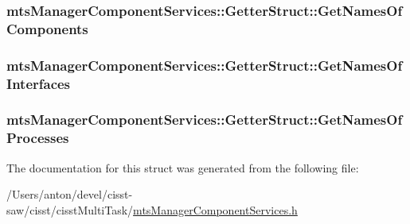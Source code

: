 \subsubsection[{Get\+Names\+Of\+Components}]{ mts\+Manager\+Component\+Services\+::\+Getter\+Struct\+::\+Get\+Names\+Of\+Components}\label{structmts_manager_component_services_1_1_getter_struct_ae997570edfaea8189ee50a91cfaa1359}
\hypertarget{structmts_manager_component_services_1_1_getter_struct_a0783d016f0e0dc078a89769f2b66f334}{}
\subsubsection[{Get\+Names\+Of\+Interfaces}]{ mts\+Manager\+Component\+Services\+::\+Getter\+Struct\+::\+Get\+Names\+Of\+Interfaces}\label{structmts_manager_component_services_1_1_getter_struct_a0783d016f0e0dc078a89769f2b66f334}
\hypertarget{structmts_manager_component_services_1_1_getter_struct_a1873270501352f0f330b0d21f555956c}{}
\subsubsection[{Get\+Names\+Of\+Processes}]{ mts\+Manager\+Component\+Services\+::\+Getter\+Struct\+::\+Get\+Names\+Of\+Processes}\label{structmts_manager_component_services_1_1_getter_struct_a1873270501352f0f330b0d21f555956c}


The documentation for this struct was generated from the following file\+:\begin{DoxyCompactItemize}
\item 
/\+Users/anton/devel/cisst-\/saw/cisst/cisst\+Multi\+Task/\hyperlink{mts_manager_component_services_8h}{mts\+Manager\+Component\+Services.\+h}\end{DoxyCompactItemize}
